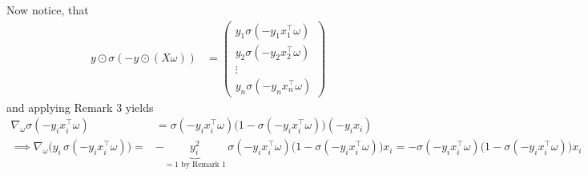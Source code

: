 \documentclass{article}
\begin{document}
Now notice, that
\begin{align*}
y \odot \sigma(-y \odot (X\omega)) &= \begin{pmatrix}
y_1 \sigma(-y_1 x_1^\top \omega) \\
y_2 \sigma(-y_2 x_2^\top \omega) \\
\vdots \\
y_n \sigma(-y_n x_n^\top \omega)
\end{pmatrix}
\end{align*}
and applying Remark 3 yields 
\begin{align*}
\nabla_\omega \sigma(-y_i x_i^\top \omega) 
&= \sigma(-y_i x_i^\top \omega)\big(1 - \sigma(-y_i x_i^\top \omega)\big)(-y_i x_i) \\
%
\implies \nabla_\omega \big(y_i \, \sigma(-y_i x_i^\top \omega)\big) 
=& -\underbrace{y_i^2}_{=1 \text{ by Remark 1}} \, \sigma(-y_i x_i^\top \omega)\big(1 - \sigma(-y_i x_i^\top \omega)\big) x_i 
=- \sigma(-y_i x_i^\top \omega)\big(1 - \sigma(-y_i x_i^\top \omega)\big) x_i \\
%
\end{align*}
%
\end{document}
